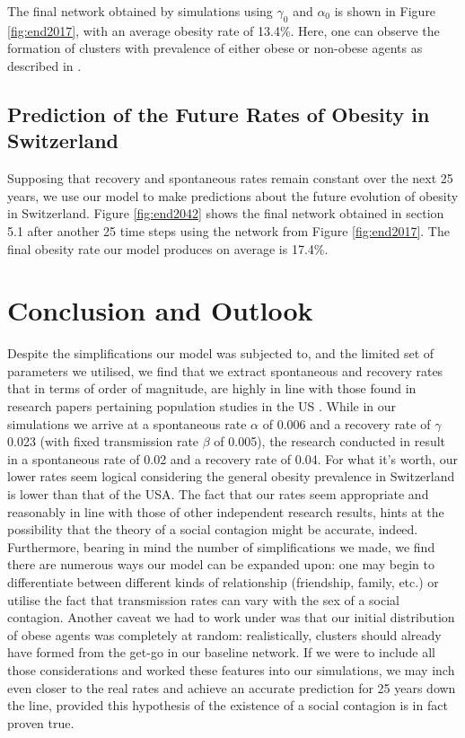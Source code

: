 \documentclass[11pt]{article}
\begin{document}
The final network obtained by simulations using $\gamma_0$ and $\alpha_0$ is shown in Figure \ref{fig:end2017}, with an average obesity rate of 13.4\%. Here, one can observe the formation of clusters with prevalence of either obese or non-obese agents as described in \cite{spreadOfObesityPaper}.

\subsection{Prediction of the Future Rates of Obesity in Switzerland}

Supposing that recovery and spontaneous rates remain constant over the next 25 years, we use our model to make predictions about the future evolution of obesity in Switzerland. Figure \ref{fig:end2042} shows the final network obtained in section 5.1 after another 25 time steps using the network from Figure \ref{fig:end2017}. The final obesity rate our model produces on average is 17.4\%.

\newpage

\section{Conclusion and Outlook}

Despite the simplifications our model was subjected to, and the limited set of parameters we utilised, we find that we extract spontaneous and recovery rates that in terms of order of magnitude, are highly in line with those found in research papers pertaining population studies in the US \cite{infectiousDiseaseModeling}. While in our simulations we arrive at a spontaneous rate \(\alpha\) of 0.006 and a recovery rate of \(\gamma\) 0.023 (with fixed transmission rate \(\beta\) of 0.005), the research conducted in \cite{infectiousDiseaseModeling} result in a spontaneous rate of 0.02 and a recovery rate of 0.04. For what it's worth, our lower rates seem logical considering the general obesity prevalence in Switzerland is lower than that of the USA. The  fact that our rates seem appropriate and reasonably in line with those of other independent research results, hints at the possibility that the theory of a social contagion might be accurate, indeed. \\

Furthermore, bearing in mind the number of simplifications we made, we find there are numerous ways our model can be expanded upon: one may begin to differentiate between different kinds of relationship (friendship, family, etc.)\cite{spreadOfObesityPaper} or utilise the fact that transmission rates can vary with the sex of a social contagion. Another caveat we had to work under was that our initial distribution of obese agents was completely at random: realistically, clusters should already have formed from the get-go in our baseline network. If we were to include all those considerations and worked these features into our simulations, we may inch even closer to the real rates and achieve an accurate prediction for 25 years down the line, provided this hypothesis of the existence of a social contagion is in fact proven true.\\
\end{document}
